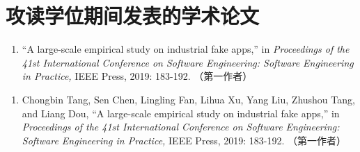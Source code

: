 \chapter*{攻读学位期间发表的学术论文}


\ifdefined \anonymous
	\begin{enumerate}
		\item ``A large-scale empirical study on industrial fake apps,'' in \textit{Proceedings of the 41st International Conference on Software Engineering: Software Engineering in Practice,} IEEE Press, 2019: 183-192. （第一作者）
	\end{enumerate}
\else
	\begin{enumerate}
		\item Chongbin Tang, Sen Chen, Lingling Fan, Lihua Xu, Yang Liu, Zhushou Tang, and Liang Dou, ``A large-scale empirical study on industrial fake apps,'' in \textit{Proceedings of the 41st International Conference on Software Engineering: Software Engineering in Practice,} IEEE Press, 2019: 183-192. （第一作者）
	\end{enumerate}
\fi
